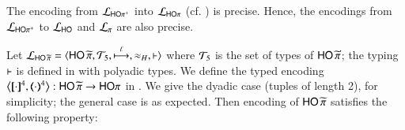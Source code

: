 
\begin{theorem}
	\label{f:enc:hopiptohopi}
	The encoding from $\mathcal{L}_{\mathsf{HO\pi^{+}}}$ into $\mathcal{L}_{\mathsf{HO}\pi}$ (cf. )
	is precise. Hence, the encodings 
	from $\mathcal{L}_{\mathsf{HO\pi^{+}}}$ to $\mathcal{L}_{\mathsf{HO}}$ 
	and $\mathcal{L}_{\pi}$ 
	are also precise. 
\end{theorem}



%
\label{subsec:pho}
Let
	$\mathcal{L}_{\mathsf{HO}\,{\widetilde{\pi}}}=\langle \mathsf{HO}\,{\widetilde{\pi}}, {\cal{T}}_5, \stackrel{\ell}{\longmapsto}, \approx_H, \vdash \rangle$
where 
	${\cal{T}}_5$ is the set of types of $\mathsf{HO}\,{\widetilde{\pi}}$;  
the typing $\vdash$ is defined in
 with polyadic types. 
We define the typed encoding
	$\enco{\map{\cdot}^{4}, \mapt{\cdot}^{4}}: \PHOp \to \HOp$ 
in .
We give the dyadic case (tuples of length 2), for simplicity;
the general case is as expected.
Then encoding of $\mathsf{HO}\,{\widetilde{\pi}}$  satisfies the following property:

